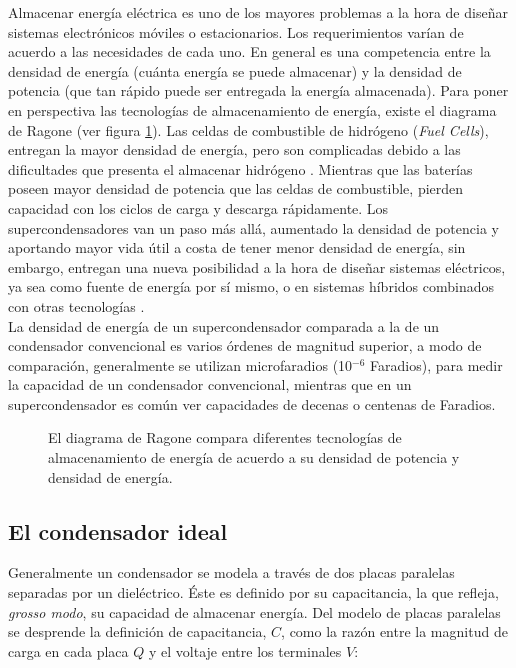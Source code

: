 Almacenar energía eléctrica es uno de los mayores problemas a la hora de diseñar sistemas electrónicos móviles o estacionarios. Los requerimientos varían de acuerdo a las necesidades de cada uno. En general es una competencia entre la densidad de energía (cuánta energía se puede almacenar) y la densidad de potencia (que tan rápido puede ser entregada la energía almacenada). Para poner en perspectiva las tecnologías de almacenamiento de energía, existe el diagrama de Ragone (ver figura \ref{fig:ragone}). Las celdas de combustible de hidrógeno (\textit{Fuel Cells}), entregan la mayor densidad de energía, pero son complicadas debido a las dificultades que presenta el almacenar hidrógeno \citep{Hadjipaschalis2009}. Mientras que las baterías poseen mayor densidad de potencia que las celdas de combustible, pierden capacidad con los ciclos de carga y descarga rápidamente. Los supercondensadores van un paso más allá, aumentado la densidad de potencia y aportando mayor vida útil a costa de tener menor densidad de energía, sin embargo, entregan una nueva posibilidad a la hora de diseñar sistemas eléctricos, ya sea como fuente de energía por sí mismo, o en sistemas híbridos combinados con otras tecnologías \citep{Thounthong2009}.\\
La densidad de energía de un supercondensador comparada a la de un condensador convencional es varios órdenes de magnitud superior, a modo de comparación, generalmente se utilizan microfaradios (10$^{-6}$ Faradios), para medir la capacidad de un condensador convencional, mientras que en un supercondensador es común ver capacidades de decenas o centenas de Faradios.


\begin{figure}
	\centering
	\caption[Diagrama de Ragone, diferentes tecnologías de almacenamiento de energía]{El diagrama de Ragone compara diferentes tecnologías de almacenamiento de energía de acuerdo a su densidad de potencia y densidad de energía.}
	\label{fig:ragone}
\end{figure}

\subsection{El condensador ideal}
Generalmente un condensador se modela a través de dos placas paralelas separadas por un dieléctrico. Éste es definido por su capacitancia, la que refleja, \emph{grosso modo}, su capacidad de almacenar energía. Del modelo de placas paralelas se desprende la definición de capacitancia, $C$, como la razón entre la magnitud de carga en cada placa $Q$ y el voltaje entre los terminales $V$:

